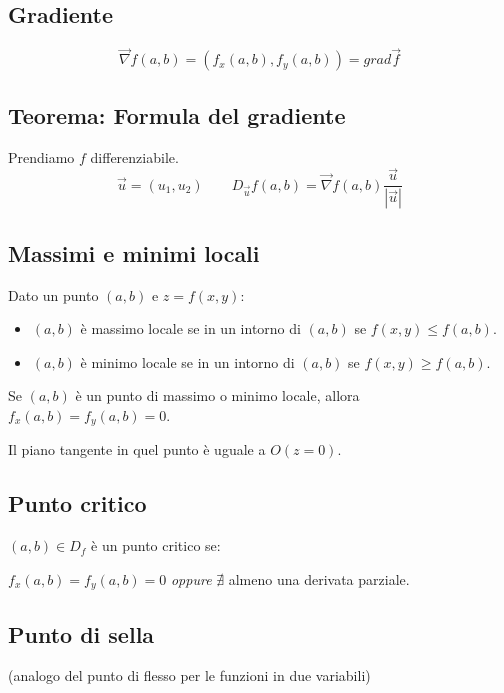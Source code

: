 \documentclass[10pt,a4paper,fleqn]{article}
\begin{document}
	\subsection{Gradiente}

	\begin{equation}
	\vec{\nabla}f(a, b) = (f_x(a, b), f_y(a, b)) = grad \vec{f}
	\end{equation}

	\subsection{Teorema: Formula del gradiente}

	Prendiamo $f$ differenziabile.
	\begin{equation}
	\vec{u}=(u_1, u_2) \qquad D_{\vec{u}} f(a, b) = \vec{\nabla} f(a, b) \frac{\vec{u}}{|\vec{u}|}
	\end{equation}

	\subsection{Massimi e minimi locali}

	Dato un punto $(a, b)$ e $z = f(x, y)$:
	\begin{itemize}
		\item $(a, b)$ è massimo locale se in un intorno di $(a, b)$ se $f(x, y) \leq f(a, b)$.
		\item$(a, b)$ è minimo locale se in un intorno di $(a, b)$ se $f(x, y) \geq f(a, b)$.
	\end{itemize}
	
	Se $(a, b)$ è un punto di massimo o minimo locale, allora $f_x(a, b) = f_y(a, b) = 0$.
	
	Il piano tangente in quel punto è uguale a $O(z=0)$.

	\subsection{Punto critico}

	$(a, b) \in D_f$ è un punto critico se:
	
	$f_x(a, b) = f_y(a, b) = 0$ \qquad \textit{oppure} \qquad
	$\nexists$ almeno una derivata parziale.

	\subsection{Punto di sella} (analogo del punto di flesso per le funzioni in due variabili)\\
\end{document}
